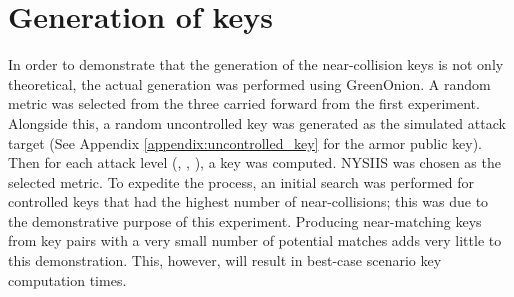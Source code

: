 \section{Generation of keys}
\label{sec:key_gen}
In order to demonstrate that the generation of the near-collision keys is not only theoretical, the actual generation was performed using GreenOnion. A random metric was selected from the three carried forward from the first experiment. Alongside this, a random uncontrolled key was generated as the simulated attack target (See Appendix \ref{appendix:uncontrolled_key} for the armor public key). Then for each attack level (\OOOO, \XOOO, \XOOX), a key was computed. NYSIIS was chosen as the selected metric. To expedite the process, an initial search was performed for controlled keys that had the highest number of near-collisions; this was due to the demonstrative purpose of this experiment. Producing near-matching keys from key pairs with a very small number of potential matches adds very little to this demonstration. This, however, will result in best-case scenario key computation times.

